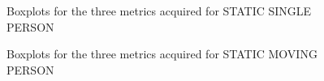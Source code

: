 \begin{figure}[t!]
\hspace{0.1cm}
%

\caption{Boxplots for the three metrics acquired for STATIC SINGLE PERSON}
\label{fig:boxplots_singlePerson}
\end{figure}

\begin{figure}[t!]
\centering
{}%
\hspace{0.1cm}
%

\caption{Boxplots for the three metrics acquired for STATIC MOVING PERSON}
\label{fig:boxplots_singlePersonMov}
\end{figure}


